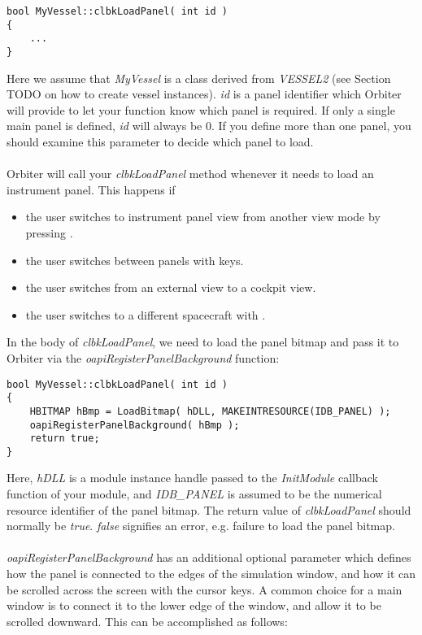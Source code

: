 \documentclass[Orbiter Developer Manual.tex]{subfiles}
\begin{document}
\begin{lstlisting}
bool MyVessel::clbkLoadPanel( int id )
{
	...
}
\end{lstlisting}

\noindent
Here we assume that \textit{MyVessel} is a class derived from \textit{VESSEL2} (see Section TODO on how to create vessel instances). \textit{id} is a panel identifier which Orbiter will provide to let your function know which panel is required. If only a single main panel is defined, \textit{id} will always be 0. If you define more than one panel, you should examine this parameter to decide which panel to load.\\
\\
Orbiter will call your \textit{clbkLoadPanel} method whenever it needs to load an instrument panel. This happens if

\begin{itemize}
\item the user switches to instrument panel view from another view mode by pressing .
\item the user switches between panels with \Ctrl\DArrow\UArrow\RArrow\LArrow keys.
\item the user switches from an external view to a cockpit view.
\item the user switches to a different spacecraft with .
\end{itemize}

\noindent
In the body of \textit{clbkLoadPanel}, we need to load the panel bitmap and pass it to Orbiter via the \textit{oapiRegisterPanelBackground} function:

\begin{lstlisting}
bool MyVessel::clbkLoadPanel( int id )
{
	HBITMAP hBmp = LoadBitmap( hDLL, MAKEINTRESOURCE(IDB_PANEL) );
	oapiRegisterPanelBackground( hBmp );
	return true;
}
\end{lstlisting}

\noindent
Here, \textit{hDLL} is a module instance handle passed to the \textit{InitModule} callback function of your module, and \textit{IDB\_PANEL} is assumed to be the numerical resource identifier of the panel bitmap. The return value of \textit{clbkLoadPanel} should normally be \textit{true}. \textit{false} signifies an error, e.g. failure to load the panel bitmap.\\
\\
\textit{oapiRegisterPanelBackground} has an additional optional parameter which defines how the panel is connected to the edges of the simulation window, and how it can be scrolled across the screen with the cursor keys. A common choice for a main window is to connect it to the lower edge of the window, and allow it to be scrolled downward. This can be accomplished as follows:
\end{document}
